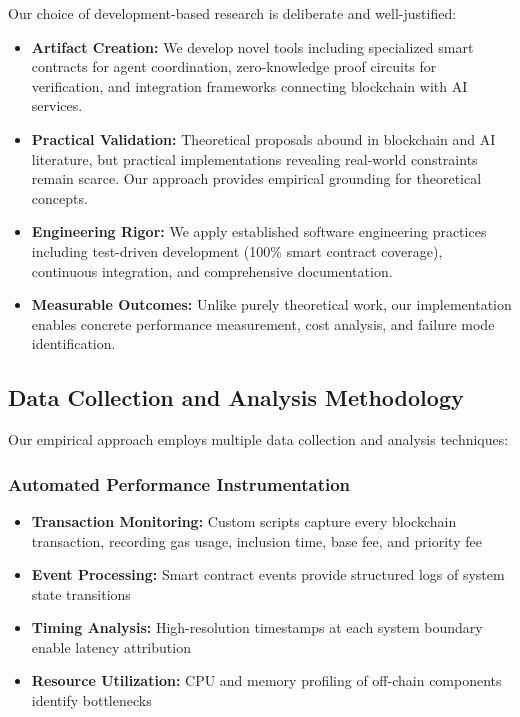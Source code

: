 Our choice of development-based research is deliberate and well-justified:

\begin{itemize}
    \item \textbf{Artifact Creation:} We develop novel tools including specialized smart contracts for agent coordination, zero-knowledge proof circuits for verification, and integration frameworks connecting blockchain with AI services.
    
    \item \textbf{Practical Validation:} Theoretical proposals abound in blockchain and AI literature, but practical implementations revealing real-world constraints remain scarce. Our approach provides empirical grounding for theoretical concepts.
    
    \item \textbf{Engineering Rigor:} We apply established software engineering practices including test-driven development (100\% smart contract coverage), continuous integration, and comprehensive documentation.
    
    \item \textbf{Measurable Outcomes:} Unlike purely theoretical work, our implementation enables concrete performance measurement, cost analysis, and failure mode identification.
\end{itemize}

\subsection{Data Collection and Analysis Methodology}

Our empirical approach employs multiple data collection and analysis techniques:

\subsubsection{Automated Performance Instrumentation}
\begin{itemize}
    \item \textbf{Transaction Monitoring:} Custom scripts capture every blockchain transaction, recording gas usage, inclusion time, base fee, and priority fee
    \item \textbf{Event Processing:} Smart contract events provide structured logs of system state transitions
    \item \textbf{Timing Analysis:} High-resolution timestamps at each system boundary enable latency attribution
    \item \textbf{Resource Utilization:} CPU and memory profiling of off-chain components identify bottlenecks
\end{itemize}

